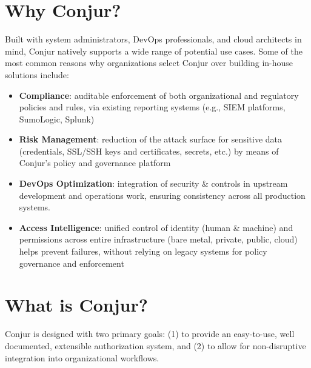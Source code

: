 \documentclass[10pt, a5paper]{article}
\begin{document}
\section*{Why Conjur? }
Built with system administrators, DevOps professionals, and cloud architects in mind, Conjur natively supports a wide range of potential use cases. Some of the most common reasons why organizations select Conjur over building in-house solutions include: 
\begin{itemize}
\item {\bf Compliance}: auditable enforcement of both organizational and regulatory policies and rules, via existing reporting systems (e.g., SIEM platforms, SumoLogic, Splunk) 
\item {\bf Risk Management}: reduction of the attack surface for sensitive data
(credentials, SSL/SSH keys and certificates, secrets, etc.) by means of
Conjur’s policy and governance platform

\item {\bf DevOps Optimization}: integration of security \& controls in upstream development and operations work, ensuring consistency across all production systems. 
\item {\bf Access Intelligence}: unified control of identity (human \& machi\-ne) and permissions across entire infrastructure (bare metal, pri\-vate, public, cloud) helps prevent failures, without relying on legacy systems for policy governance and enforcement 
\end{itemize}

\section*{What is Conjur?}


Conjur is designed with two primary goals: (1) to provide an easy-to-use, well documented, extensible authorization system, and (2) to allow for non-disruptive integration into organizati\-onal workflows. 
\end{document}
